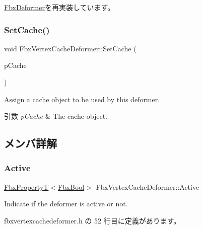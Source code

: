\hyperlink{class_fbx_deformer_ac3f5a3eb2dda62397fc667004d798319}{Fbx\+Deformer}を再実装しています。

\mbox{\label{class_fbx_vertex_cache_deformer_a773ff8a21ec72cf5e18f4b29ea86f7bc}} 
\subsubsection{\texorpdfstring{Set\+Cache()}{SetCache()}}
{\footnotesize\ttfamily void Fbx\+Vertex\+Cache\+Deformer\+::\+Set\+Cache (\begin{DoxyParamCaption}\item[{\hyperlink{class_fbx_cache}{Fbx\+Cache} $\ast$}]{p\+Cache }\end{DoxyParamCaption})}

Assign a cache object to be used by this deformer. 
\begin{DoxyParams}{引数}
{\em p\+Cache} & The cache object. \\
\hline
\end{DoxyParams}


\subsection{メンバ詳解}
\mbox{\label{class_fbx_vertex_cache_deformer_a12288746509d99e897af0786ec6fc33f}} 
\subsubsection{\texorpdfstring{Active}{Active}}
{\footnotesize\ttfamily \hyperlink{class_fbx_property_t}{Fbx\+PropertyT}$<$\hyperlink{fbxtypes_8h_a92e0562b2fe33e76a242f498b362262e}{Fbx\+Bool}$>$ Fbx\+Vertex\+Cache\+Deformer\+::\+Active}



Indicate if the deformer is active or not. 



 fbxvertexcachedeformer.\+h の 52 行目に定義があります。

\mbox{\label{class_fbx_vertex_cache_deformer_a2f320220fffbd0b7f20b074d7b2de4fb}} 

